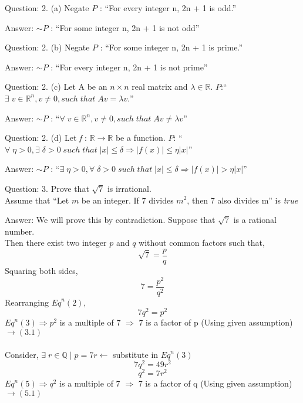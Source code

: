 \documentclass[a4paper]{article}
\begin{document}
\begin{qalist}
		\item[Question: 2. (a)] Negate $P$ : ``For every integer n, 2n + 1 is odd.''
		\item[Answer:] $\sim P$ : ``For some integer n, 2n + 1 is not odd''
		
		\item[Question: 2. (b)] Negate $P$ : ``For some integer n, 2n + 1 is prime.''
		\item[Answer:] $\sim P$ : ``For every integer n, 2n + 1 is not prime''
		
		\item[Question: 2. (c)] Let A be an $n \times n$ real matrix and $\lambda \in \mathbb{R}$. $P$:`` $\exists\; v \in \mathbb{R}^{n} , v \neq 0, such\;that \; Av = \lambda v.$'' 
		\item[Answer:] $\sim P$ : ``$\forall\; v \in \mathbb{R}^{n} , v \neq 0, such\;that \; Av \neq \lambda v$''
		
		\item[Question: 2. (d)] Let \textit{f} : $\mathbb{R} \rightarrow \mathbb{R}$ be a function. $P$: ``$\forall \; \eta > 0, \exists \; \delta > 0 \; such \; that \; |x| \leq \delta \Rightarrow |f(x)| \leq \eta |x|$''
		\item[Answer:] $\sim P$ : ``$\exists \; \eta > 0, \forall \; \delta > 0 \; such \; that \; |x| \leq \delta \Rightarrow |f(x)| > \eta |x|$''
		
		\item[Question: 3.] \setcounter{equation}{0} Prove that $\sqrt{7}$ is irrational. \\Assume that ``Let $m$ be an integer. If 7 divides ${m}^{2}$, then 7 also divides m'' is \textit{true}
		\item[Answer:] We will prove this by contradiction. Suppose that $\sqrt{7}$ is a rational number. \\
		Then there exist two  integer $p$ and $q$ without common factors such that, 
		\begin{equation}
			\sqrt{7} = \frac{p}{q}
		\end{equation}
		Squaring both sides, 
		\begin{equation}
			7 = \frac{{p}^{2}}{{q}^{2}}
		\end{equation}
		Rearranging ${Eq}^{n} (2)$, 
		\begin{equation}
			7{q}^{2} = {p}^{2}
		\end{equation}
		${Eq}^{n} (3) \Rightarrow {p}^{2}$ is a multiple of 7 $\Rightarrow$ 7 is a factor of p (Using given assumption)$\rightarrow (3.1)$ \\
		\\ Consider, $\exists \; r \in \mathbb{Q} \;|\; p = 7r \leftarrow$ substitute in ${Eq}^{n} (3)$
		\begin{equation}
			7{q}^{2} = 49{r}^{2}
		\end{equation}
		\begin{equation}
			{q}^{2} = 7{r}^{2}
		\end{equation}
		${Eq}^{n} (5) \Rightarrow {q}^{2}$ is a multiple of 7 $\Rightarrow$ 7 is a factor of q (Using given assumption)$\rightarrow (5.1)$ \\
		

\end{qalist}
\end{document}
